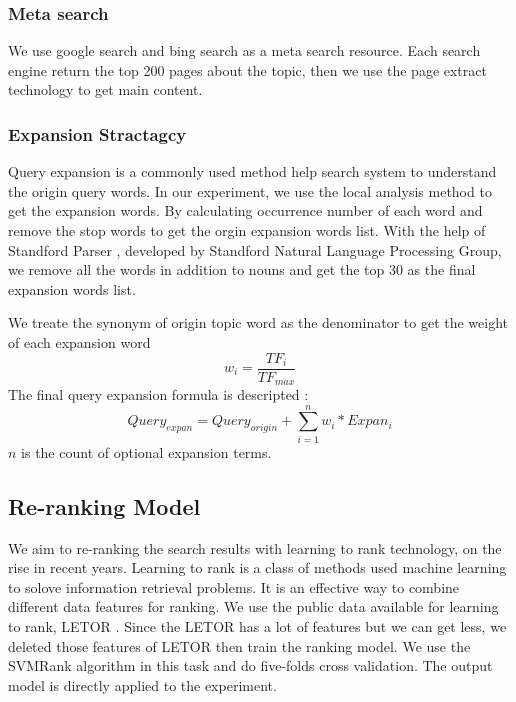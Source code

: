 \documentclass[runningheads,a4paper]{llncs}
\begin{document}
\subsubsection{Meta search}

We use google search and bing search as a meta search resource. Each search engine return the top 200 pages about the topic, then we use  the page extract technology \cite{2012-Lin-p256-264} to get main content.  

\subsubsection{Expansion Stractagcy}
Query expansion is a commonly used method help search system to understand the origin query words. In our experiment, we use the local analysis \cite{2010-Imran-p386-393} method to get the expansion words. By calculating occurrence number of each word and remove the stop words to get the orgin expansion words list. With the help of Standford Parser \cite{standfordparser} , developed by Standford Natural Language Processing Group, we remove all the words in addition to nouns and get the top 30 as the final expansion words list.

We treate the synonym of origin topic word as the denominator to get the weight of each expansion word
\begin{equation}
w_i = \frac{TF_i}{TF_{max}}
\end{equation}
The final query expansion formula is descripted : 
\begin{equation}
Query_{expan} = Query_{origin} + \sum_{i=1}^n w_i * Expan_i
\end{equation}
$n$ is the count of optional expansion terms.
\subsection{Re-ranking Model}

We aim to re-ranking the search results with learning to rank technology, on the rise in recent years. Learning to rank is a class of methods used machine learning to solove information retrieval problems. It is an effective way to combine different data features for ranking. We use the public data available for learning to rank, LETOR \cite{2007-Liu-p3-10}. Since the LETOR has a lot of features but we can get less,  we deleted those features of LETOR then train the ranking model. We use the SVMRank \cite{2010-Chapelle-p201-215} algorithm in this task and do five-folds cross validation. The output model is directly applied to the experiment.
\end{document}
